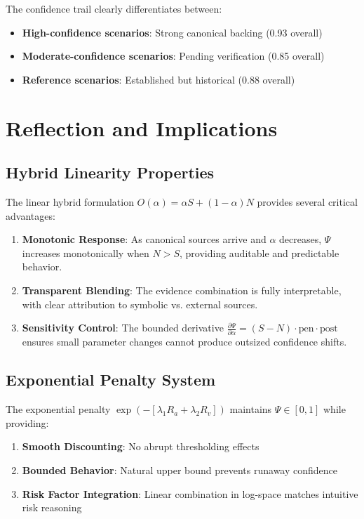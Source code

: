\documentclass[12pt,a4paper]{article}
\begin{document}
The confidence trail clearly differentiates between:
\begin{itemize}
    \item \textbf{High-confidence scenarios}: Strong canonical backing (0.93 overall)
    \item \textbf{Moderate-confidence scenarios}: Pending verification (0.85 overall)  
    \item \textbf{Reference scenarios}: Established but historical (0.88 overall)
\end{itemize}

\section{Reflection and Implications}

\subsection{Hybrid Linearity Properties}

The linear hybrid formulation $O(\alpha) = \alpha S + (1-\alpha) N$ provides several critical advantages:

\begin{enumerate}
    \item \textbf{Monotonic Response}: As canonical sources arrive and $\alpha$ decreases, $\Psi$ increases monotonically when $N > S$, providing auditable and predictable behavior.
    
    \item \textbf{Transparent Blending}: The evidence combination is fully interpretable, with clear attribution to symbolic vs. external sources.
    
    \item \textbf{Sensitivity Control}: The bounded derivative $\frac{\partial \Psi}{\partial \alpha} = (S-N) \cdot \text{pen} \cdot \text{post}$ ensures small parameter changes cannot produce outsized confidence shifts.
\end{enumerate}

\subsection{Exponential Penalty System}

The exponential penalty $\exp(-[\lambda_1 R_a + \lambda_2 R_v])$ maintains $\Psi \in [0,1]$ while providing:

\begin{enumerate}
    \item \textbf{Smooth Discounting}: No abrupt thresholding effects
    \item \textbf{Bounded Behavior}: Natural upper bound prevents runaway confidence
    \item \textbf{Risk Factor Integration}: Linear combination in log-space matches intuitive risk reasoning
\end{enumerate}
\end{document}
